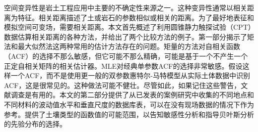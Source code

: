 \documentclass{bilidoc}
\begin{document}
\begin{ParaColumn}[][0.62\textwidth]
    空间变异性是岩土工程应用中主要的不确定性来源之一。这种变异性通常以相关距离为特征。相关距离描述了土或岩石的参数相似或相关的距离。为了最好地表征和模拟空间可变场，需要相关距离。本文首先概述了利用圆锥静力触探试验（CPT）数据估算相关距离的各种方法，并给出了两个比较方法的例子。第一部分揭示了矩法和最大似然法这两种常用的估计方法存在的问题。矩量的方法对自相关函数（ACF）的选择不那么敏感，但它可能不那么精确，可能是基于一个不产生一个正定自相关矩阵的相关估计器。MLE对经典单参数ACF的选择非常敏感。假设这样一个ACF，而不是使用更一般的双参数惠特尔-马特模型从实际土体数据中识别ACF，这是很常见的。这种做法可能不健壮。尽管如此，如果记住这些警告，文献调查是有用的。本文的第二部分提供了从已发表的案例研究中收集的不同地点和不同材料的波动值水平和垂直尺度的数据库表，可以在没有现场数据的情况下作为参考。提供了土壤类型的函数值的可能范围，以告知敏感性分析和指导贝叶斯分析的先验分布的选择。

\end{ParaColumn}






    
\end{document}
